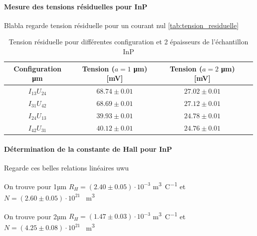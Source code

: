 \paragraph*{Mesure des tensions résiduelles pour InP}
Blabla regarde tension résiduelle pour un courant nul \autoref{tab:tension_residuelle}

\begin{table}[h]
    \centering
    \begin{tabulary}{\textwidth}{C C C C}
        \toprule
        Configuration \si{\micro\meter} & Tension (\(a = 1\) \si{\micro\meter}) [\si{\milli\volt}] & Tension (\(a = 2\) \si{\micro\meter}) [\si{\milli\volt}] \\
        \midrule
        \(I_{13}U_{24}\) & \(68.74 \pm 0.01\) & \(27.02 \pm 0.01\) \\
        \(I_{31}U_{42}\) & \(68.69 \pm 0.01\) & \(27.12 \pm 0.01\) \\
        \(I_{24}U_{13}\) & \(39.93 \pm 0.01\) & \(24.78 \pm 0.01\) \\
        \(I_{42}U_{31}\) & \(40.12 \pm 0.01\) & \(24.76 \pm 0.01\) \\
        \bottomrule
    \end{tabulary}
    \caption{Tension résiduelle pour différentes configuration et 2 épaisseurs de l'échantillon InP}
    \label{tab:tension_residuelle}
\end{table}

\paragraph*{Détermination de la constante de Hall pour InP}
Regarde ces belles relations linéaires uwu

On trouve pour 1µm \(R_H = (2.40 \pm 0.05) \cdot 10^{-3}\) \si{\meter\cubed\per\coulomb} et \(N = (2.60 \pm 0.05) \cdot 10^{21}\) \si{\per\meter\cubed}

On trouve pour 2µm \(R_H = (1.47 \pm 0.03) \cdot 10^{-3}\) \si{\meter\cubed\per\coulomb} et \(N = (4.25 \pm 0.08) \cdot 10^{21}\) \si{\per\meter\cubed}

